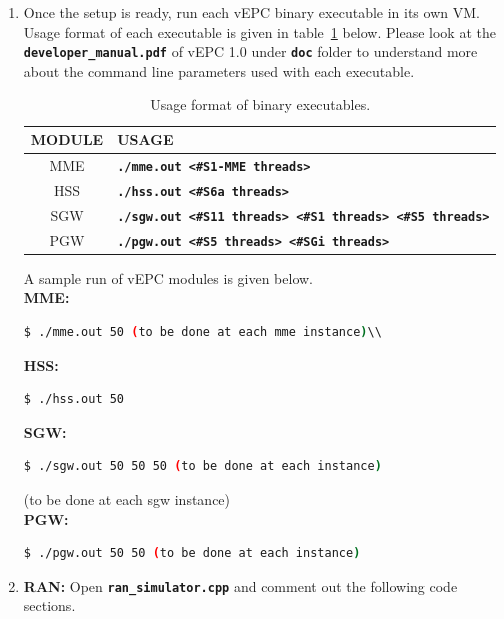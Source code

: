 \pdfminorversion=4\documentclass[hidelinks]{report}
\newcommand{\cf}[1] {
	\textbf{\texttt{#1}}
}
\begin{document}
\begin{enumerate}

\item Once the setup is ready, run each vEPC binary executable in its own VM. Usage format of each executable is given in table~\ref{bin_format} below. Please look at the \cf{developer\_manual.pdf} of vEPC 1.0 under \cf{doc} folder to understand more about the command line parameters used with each executable.

\begin{table}[H]

\caption{Usage format of binary executables.}
\centering
\label{bin_format}
\def\arraystretch{1.5}

\begin{tabular}{|c|p{11.5 cm}|}

\hline
\textbf{MODULE} & \textbf{USAGE} \\
\hline
MME & \cf{./mme.out <\#S1-MME threads>} \\
HSS & \cf{./hss.out <\#S6a threads>} \\
SGW & \cf{./sgw.out <\#S11 threads> <\#S1 threads> <\#S5 threads>} \\
PGW & \cf{./pgw.out <\#S5 threads> <\#SGi threads>} \\
\hline

\end{tabular}

\end{table}

A sample run of vEPC modules is given below.
~\\ \textbf{MME:}

\begin{lstlisting}[language=bash]
$ ./mme.out 50 (to be done at each mme instance)\\

\end{lstlisting}
\textbf{HSS:}
\begin{lstlisting}[language=bash]
$ ./hss.out 50 
\end{lstlisting}

\textbf{SGW:}
\begin{lstlisting}[language=bash]
$ ./sgw.out 50 50 50 (to be done at each instance)
\end{lstlisting}
(to be done at each sgw instance)\\
\textbf{PGW:}
\begin{lstlisting}[language=bash]
$ ./pgw.out 50 50 (to be done at each instance)
\end{lstlisting}
\item \textbf{RAN:} Open \cf{ran\_simulator.cpp} and comment out the following code sections.


\end{enumerate}
\end{document}

